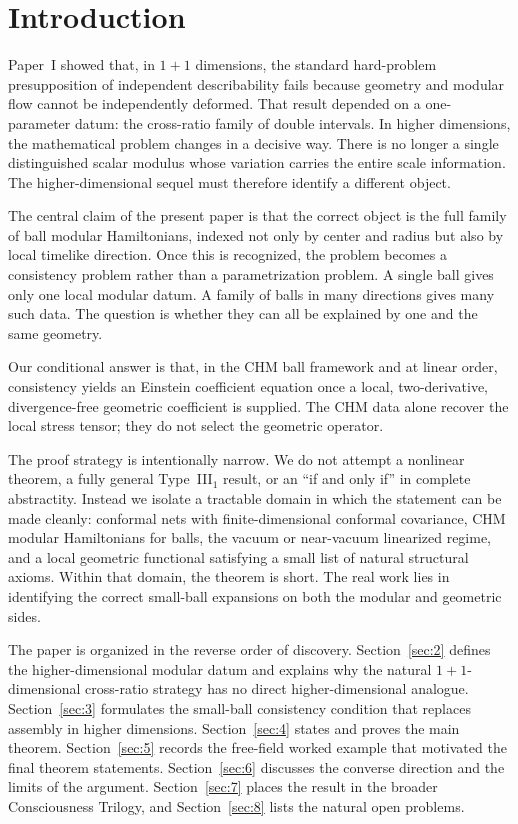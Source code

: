 \documentclass[12pt]{article}
\theoremstyle{definition}
\theoremstyle{remark}
\begin{document}
\clearpage
\tableofcontents
\clearpage

\section{Introduction}\label{sec:1}

Paper~I\cite{PaperI} showed that, in \(1+1\) dimensions, the standard hard-problem presupposition of independent describability fails because geometry and modular flow cannot be independently deformed. That result depended on a one-parameter datum: the cross-ratio family of double intervals. In higher dimensions, the mathematical problem changes in a decisive way. There is no longer a single distinguished scalar modulus whose variation carries the entire scale information. The higher-dimensional sequel must therefore identify a different object.

The central claim of the present paper is that the correct object is the full family of ball modular Hamiltonians, indexed not only by center and radius but also by local timelike direction. Once this is recognized, the problem becomes a consistency problem rather than a parametrization problem. A single ball gives only one local modular datum. A family of balls in many directions gives many such data. The question is whether they can all be explained by one and the same geometry.

Our conditional answer is that, in the CHM ball framework and at linear
order, consistency yields an Einstein coefficient equation once a local,
two-derivative, divergence-free geometric coefficient is supplied. The
CHM data alone recover the local stress tensor; they do not select the
geometric operator.

The proof strategy is intentionally narrow. We do not attempt a nonlinear theorem, a fully general Type~III$_1$ result, or an ``if and only if'' in complete abstractity. Instead we isolate a tractable domain in which the statement can be made cleanly: conformal nets with finite-dimensional conformal covariance, CHM modular Hamiltonians for balls, the vacuum or near-vacuum linearized regime, and a local geometric functional satisfying a small list of natural structural axioms. Within that domain, the theorem is short. The real work lies in identifying the correct small-ball expansions on both the modular and geometric sides.

The paper is organized in the reverse order of discovery. Section~\ref{sec:2} defines the higher-dimensional modular datum and explains why the natural \(1+1\)-dimensional cross-ratio strategy has no direct higher-dimensional analogue. Section~\ref{sec:3} formulates the small-ball consistency condition that replaces assembly in higher dimensions. Section~\ref{sec:4} states and proves the main theorem. Section~\ref{sec:5} records the free-field worked example that motivated the final theorem statements. Section~\ref{sec:6} discusses the converse direction and the limits of the argument. Section~\ref{sec:7} places the result in the broader Consciousness Trilogy, and Section~\ref{sec:8} lists the natural open problems.
\end{document}
